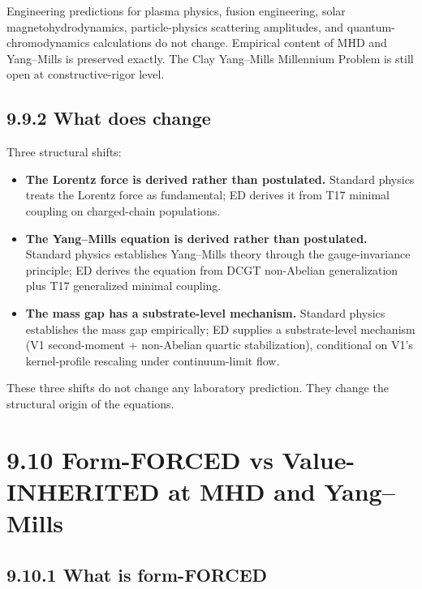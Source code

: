 \documentclass[11pt]{book}
\begin{document}
Engineering predictions for plasma physics, fusion engineering, solar magnetohydrodynamics, particle-physics scattering amplitudes, and quantum-chromodynamics calculations do not change. Empirical content of MHD and Yang–Mills is preserved exactly. The Clay Yang–Mills Millennium Problem is still open at constructive-rigor level.

\subsection{9.9.2 What does change}

Three structural shifts:

\begin{itemize}
\item \textbf{The Lorentz force is derived rather than postulated.} Standard physics treats the Lorentz force as fundamental; ED derives it from T17 minimal coupling on charged-chain populations.
\item \textbf{The Yang–Mills equation is derived rather than postulated.} Standard physics establishes Yang–Mills theory through the gauge-invariance principle; ED derives the equation from DCGT non-Abelian generalization plus T17 generalized minimal coupling.
\item \textbf{The mass gap has a substrate-level mechanism.} Standard physics establishes the mass gap empirically; ED supplies a substrate-level mechanism (V1 second-moment + non-Abelian quartic stabilization), conditional on V1's kernel-profile rescaling under continuum-limit flow.
\end{itemize}

These three shifts do not change any laboratory prediction. They change the structural origin of the equations.

\section{9.10 Form-FORCED vs Value-INHERITED at MHD and Yang–Mills}

\subsection{9.10.1 What is form-FORCED}
\end{document}
